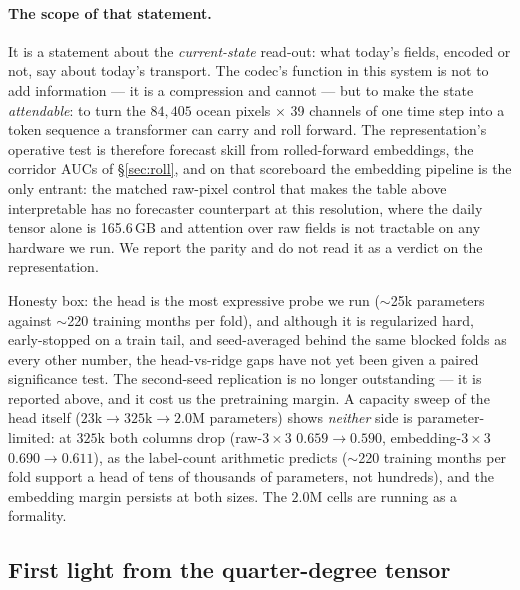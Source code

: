 \documentclass[10pt]{article}
\begin{document}
\paragraph{The scope of that statement.} It is a statement about the
\emph{current-state} read-out: what today's fields, encoded or not, say
about today's transport. The codec's function in this system is not to
add information --- it is a compression and cannot --- but to make the
state \emph{attendable}: to turn the $84{,}405$ ocean pixels $\times$ 39
channels of one time step into a token sequence a transformer can carry
and roll forward. The representation's operative test is therefore
forecast skill from rolled-forward embeddings, the corridor AUCs of
\S\ref{sec:roll}, and on that scoreboard the embedding pipeline is the
only entrant: the matched raw-pixel control that makes the table above
interpretable has no forecaster counterpart at this resolution, where the
daily tensor alone is 165.6\,GB and attention over raw fields is not
tractable on any hardware we run. We report the parity and do not read it
as a verdict on the representation.

Honesty box: the head is the most expressive probe we run
($\sim$25k parameters against $\sim$220 training months per fold), and
although it is regularized hard, early-stopped on a train tail, and
seed-averaged behind the same blocked folds as every other number, the
head-vs-ridge gaps have not yet been given a paired significance test.
The second-seed replication is no longer outstanding --- it is reported
above, and it cost us the pretraining margin. A capacity sweep of the head itself ($23$k$\to$$325$k$\to$$2.0$M
parameters) shows \emph{neither} side is parameter-limited: at $325$k
both columns drop (raw-$3\times3$ $0.659\to0.590$, embedding-$3\times3$
$0.690\to0.611$), as the label-count arithmetic predicts ($\sim$220
training months per fold support a head of tens of thousands of
parameters, not hundreds), and the embedding margin persists at both
sizes. The $2.0$M cells are running as a formality.

\subsection{First light from the quarter-degree tensor}\label{sec:qd}
\end{document}
